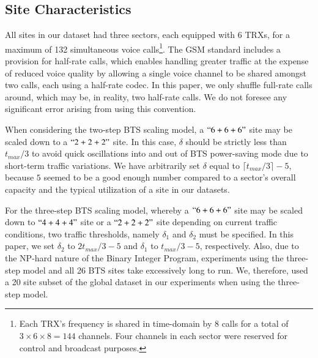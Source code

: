 
\subsection{Site Characteristics}
\label{subsec:sitetypes} All sites in our dataset had three sectors, each equipped with 6 TRXs, for a maximum of %
132 simultaneous voice calls\footnote[1]{Each TRX's frequency is shared in time-domain  by 8 calls for  a total of $3\times6\times8=144$ channels. Four channels in each sector were reserved for control and broadcast purposes.}. The GSM standard includes a provision for half-rate calls, which enables handling greater traffic at the expense of reduced voice quality by allowing a single voice channel to be shared amongst two calls, each using a half-rate codec. In this paper, we only shuffle full-rate calls around, which may be, in reality, two half-rate calls. We do not foresee any significant error arising from using this convention.

When considering the two-step BTS scaling model, a $``6+6+6"$ site may be scaled down to a $``2+2+2"$ site. In this case, $\delta$ should be strictly less than $t_{max}/3$ to avoid quick oscillations into and out of BTS power-saving mode due to short-term traffic variations. %
We have arbitrarily set $\delta$ equal to $\lceil t_{max}/3\rceil -5$, because $5$ seemed to be a good enough number compared to a sector's overall capacity and the typical utilization of a site in our datasets.

For the three-step BTS scaling model, whereby a $``6+6+6"$ site may be scaled down to $``4+4+4"$ site or a $``2+2+2"$ site depending on current traffic conditions, two traffic thresholds, namely $\delta_1$ and $\delta_2$ must be specified. In this paper, we set $\delta_2$ to $2t_{max}/3-5$ and $\delta_1$ to $t_{max}/3-5$, respectively. Also, due to the NP-hard nature of the Binary Integer Program, experiments using the three-step model and all 26 BTS sites take excessively long to run. We, therefore, used a 20 site subset of the global dataset in our experiments when using the three-step model.

